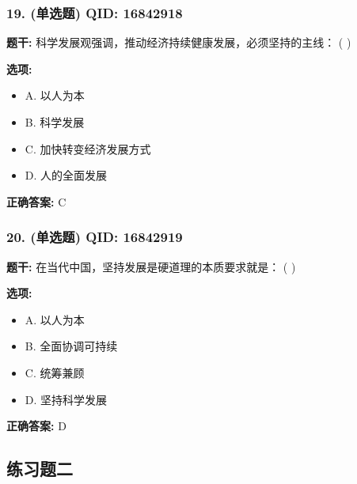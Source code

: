 \documentclass[12pt,UTF8]{ctexart}
\begin{document}
\subsubsection*{19. (单选题) \small QID: 16842918}

\textbf{题干:}
科学发展观强调，推动经济持续健康发展，必须坚持的主线： ( )

\textbf{选项:}
\begin{itemize}[leftmargin=*]

  \item A. 以人为本

  \item B. 科学发展

  \item C. 加快转变经济发展方式

  \item D. 人的全面发展

\end{itemize}

\textbf{正确答案:}
C

\vspace{0.3em}\hrulefill\vspace{0.7em}

\subsubsection*{20. (单选题) \small QID: 16842919}

\textbf{题干:}
在当代中国，坚持发展是硬道理的本质要求就是： ( )

\textbf{选项:}
\begin{itemize}[leftmargin=*]

  \item A. 以人为本

  \item B. 全面协调可持续

  \item C. 统筹兼顾

  \item D. 坚持科学发展

\end{itemize}

\textbf{正确答案:}
D

\vspace{0.3em}\hrulefill\vspace{0.7em}

\subsection*{练习题二}
\end{document}
